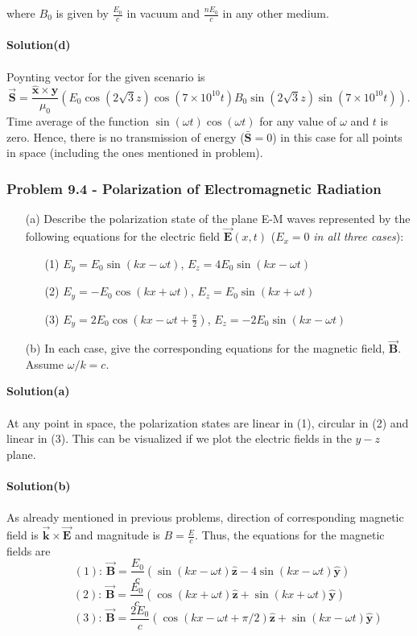 \documentclass{article}
\begin{document}
where $B_0$ is given by $\frac{E_0}{c}$ in vacuum and $\frac{nE_0}{c}$ in any other medium.
\\
\\\textbf{Solution(d)}
\\
\\Poynting vector for the given scenario is
\[\boldsymbol{\vec{S}}=\frac{\boldsymbol{\hat{x}}\times\boldsymbol{\hat{y}}}{\mu_0}\left(E_0\cos(2\sqrt{3}z)\cos(7\times10^{10}t)B_0\sin(2\sqrt{3}z)\sin(7\times10^{10}t)\right).\]
Time average of the function $\sin(\omega t)\cos(\omega t)$ for any value of $\omega$ and $t$ is zero. Hence, there is no transmission of energy ($\boldsymbol{\bar{S}}=0$) in this case for all points in space (including the ones mentioned in problem). 


\subsubsection*{Problem 9.4 - Polarization of Electromagnetic Radiation}
\begin{enumerate}
    \item[(a)]Describe the polarization state of the plane E-M waves represented by the following equations for the electric field $\boldsymbol{\vec{E}}(x,t)$ ($E_x=0$ \textit{in all three cases}):
    \begin{enumerate}
        \item[(1)]$E_y=E_0\sin(kx-\omega t)$, $E_z=4E_0\sin(kx-\omega t)$
        \item[(2)]$E_y=-E_0\cos(kx+\omega t)$, $E_z=E_0\sin(kx+\omega t)$
        \item[(3)]$E_y=2E_0\cos(kx-\omega t+\frac{\pi}{2})$, $E_z=-2E_0\sin(kx-\omega t)$
    \end{enumerate}
    \item[(b)]In each case, give the corresponding equations for the magnetic field, $\boldsymbol{\vec{B}}$. Assume $\omega/k=c$.
\end{enumerate}
\textbf{Solution(a)}
\\
\\At any point in space, the polarization states are linear in (1), circular in (2) and linear in (3). This can be visualized if we plot the electric fields in the $y-z$ plane.
\\
\\\textbf{Solution(b)}
\\
\\As already mentioned in previous problems, direction of corresponding magnetic field is $\boldsymbol{\vec{k}}\times\boldsymbol{\vec{E}}$ and magnitude is $B=\frac{E}{c}$. Thus, the equations for the magnetic fields are
\[\,\,\,(1):\,\boldsymbol{\vec{B}}=\frac{E_0}{c}\left(\sin(kx-\omega t)\boldsymbol{\hat{z}}-4\sin(kx-\omega t)\boldsymbol{\hat{y}}\right)\]
\[(2):\,\boldsymbol{\vec{B}}=\frac{E_0}{c}\left(\cos(kx+\omega t)\boldsymbol{\hat{z}}+\sin(kx+\omega t)\boldsymbol{\hat{y}}\right)\]
\[\,\,\,\,\,\,\,\,\,\,\,\,\,\,\,\,\,\,\,\,(3):\,\boldsymbol{\vec{B}}=\frac{2E_0}{c}\left(\cos(kx-\omega t+\pi/2)\boldsymbol{\hat{z}}+\sin(kx-\omega t)\boldsymbol{\hat{y}}\right)\]
\end{document}

